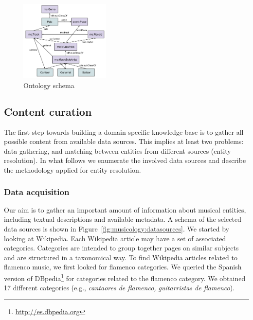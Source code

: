 \begin{figure}
	\centering
	\includegraphics[width=0.40\textwidth]{ch05_musicology_pics/flabase_ontology2.png}
	\caption{Ontology schema \label{fig:musicology:ontology}}
\end{figure}


\subsection{Content curation}
\label{sec:musicology:kb_curation}

The first step towards building a domain-specific knowledge base is to gather all possible content from available data sources. This implies at least two problems: data gathering, and matching between entities from different sources (entity resolution). In what follows we enumerate the involved data sources and describe the methodology applied for entity resolution.

\subsubsection{Data acquisition}
\label{sec:musicology:datasoruces}

Our aim is to gather an important amount of information about musical entities, including textual descriptions and available metadata. A schema of the selected data sources is shown in Figure~\ref{fig:musicology:datasources}. We started by looking at Wikipedia. %
Each Wikipedia article may have a set of associated categories. Categories are intended to group together pages on similar subjects and are structured in a taxonomical way. To find Wikipedia articles related to flamenco music, we first looked for flamenco categories. %
We queried the Spanish version of DBpedia\footnote{\url{http://es.dbpedia.org}} for categories related to the flamenco category. We obtained 17 different categories (e.g., \textit{cantaores de flamenco, guitarristas de flamenco}).

